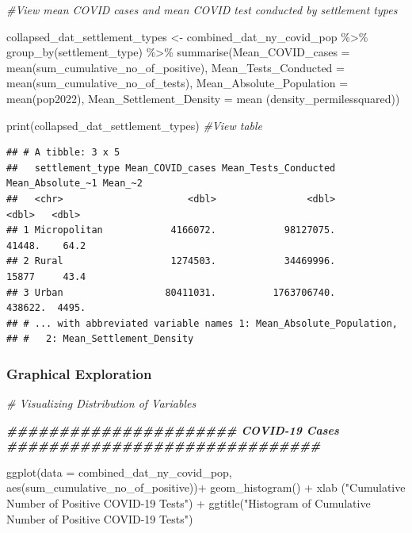\documentclass[
  12pt,
]{article}
\newenvironment{Shaded}{\begin{snugshade}}{\end{snugshade}}
\newcommand{\AttributeTok}[1]{\textcolor[rgb]{0.77,0.63,0.00}{#1}}
\newcommand{\CommentTok}[1]{\textcolor[rgb]{0.56,0.35,0.01}{\textit{#1}}}
\newcommand{\DocumentationTok}[1]{\textcolor[rgb]{0.56,0.35,0.01}{\textbf{\textit{#1}}}}
\newcommand{\FunctionTok}[1]{\textcolor[rgb]{0.00,0.00,0.00}{#1}}
\newcommand{\NormalTok}[1]{#1}
\newcommand{\OtherTok}[1]{\textcolor[rgb]{0.56,0.35,0.01}{#1}}
\newcommand{\SpecialCharTok}[1]{\textcolor[rgb]{0.00,0.00,0.00}{#1}}
\newcommand{\StringTok}[1]{\textcolor[rgb]{0.31,0.60,0.02}{#1}}
\begin{document}
\begin{Shaded}
\begin{Highlighting}[]
\CommentTok{\#View mean COVID cases and mean COVID test conducted by settlement types}


\NormalTok{collapsed\_dat\_settlement\_types }\OtherTok{\textless{}{-}}\NormalTok{ combined\_dat\_ny\_covid\_pop }\SpecialCharTok{\%\textgreater{}\%}
  \FunctionTok{group\_by}\NormalTok{(settlement\_type) }\SpecialCharTok{\%\textgreater{}\%}
  \FunctionTok{summarise}\NormalTok{(}\AttributeTok{Mean\_COVID\_cases =} \FunctionTok{mean}\NormalTok{(sum\_cumulative\_no\_of\_positive),}
            \AttributeTok{Mean\_Tests\_Conducted =} \FunctionTok{mean}\NormalTok{(sum\_cumulative\_no\_of\_tests),}
            \AttributeTok{Mean\_Absolute\_Population =} \FunctionTok{mean}\NormalTok{(pop2022),}
            \AttributeTok{Mean\_Settlement\_Density =} \FunctionTok{mean}\NormalTok{ (density\_permilessquared))}

\FunctionTok{print}\NormalTok{(collapsed\_dat\_settlement\_types) }\CommentTok{\#View table}
\end{Highlighting}
\end{Shaded}

\begin{verbatim}
## # A tibble: 3 x 5
##   settlement_type Mean_COVID_cases Mean_Tests_Conducted Mean_Absolute_~1 Mean_~2
##   <chr>                      <dbl>                <dbl>            <dbl>   <dbl>
## 1 Micropolitan            4166072.            98127075.           41448.    64.2
## 2 Rural                   1274503.            34469996.           15877     43.4
## 3 Urban                  80411031.          1763706740.          438622.  4495. 
## # ... with abbreviated variable names 1: Mean_Absolute_Population,
## #   2: Mean_Settlement_Density
\end{verbatim}

\hypertarget{graphical-exploration}{%
\subsubsection{Graphical Exploration}\label{graphical-exploration}}

\begin{Shaded}
\begin{Highlighting}[]
\CommentTok{\# Visualizing Distribution of Variables}

\DocumentationTok{\#\#\#\#\#\#\#\#\#\#\#\#\#\#\#\#\#\#\#\#\#\# COVID{-}19 Cases \#\#\#\#\#\#\#\#\#\#\#\#\#\#\#\#\#\#\#\#\#\#\#\#\#\#\#\#\#\#}

\FunctionTok{ggplot}\NormalTok{(}\AttributeTok{data =}\NormalTok{ combined\_dat\_ny\_covid\_pop, }\FunctionTok{aes}\NormalTok{(sum\_cumulative\_no\_of\_positive))}\SpecialCharTok{+}
  \FunctionTok{geom\_histogram}\NormalTok{() }\SpecialCharTok{+}
  \FunctionTok{xlab}\NormalTok{ (}\StringTok{"Cumulative Number of Positive COVID{-}19 Tests"}\NormalTok{) }\SpecialCharTok{+}
  \FunctionTok{ggtitle}\NormalTok{(}\StringTok{"Histogram of Cumulative Number of Positive COVID{-}19 Tests"}\NormalTok{)}
\end{Highlighting}
\end{Shaded}
\end{document}
